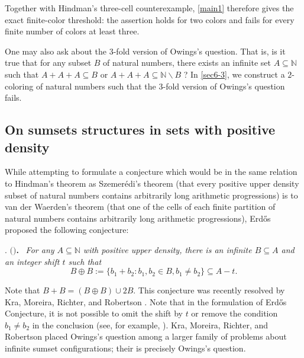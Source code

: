 \documentclass[reqno,12pt]{amsart}
\def \N {\mathbb N}
\numberwithin{equation}{section}
\begin{document}
Together with Hindman's
three-cell counterexample, \cref{main1} therefore gives the exact
finite-color threshold: the assertion holds for two colors and fails for
every finite number of colors at least three.

One may also ask about the $3$-fold version of Owings's question. That is, is it true that for any subset $B$ of natural numbers, there exists an infinite set $A\subseteq \N$ such that $A+A+A\subseteq B$ or $A+A+A\subseteq \N\backslash B$ ? In \cref{sec6-3}, we construct a $2$-coloring of natural numbers such that the $3$-fold version of Owings's question fails.

\subsection{On sumsets structures in sets with positive density}
While attempting to formulate a conjecture which would be in the same relation to Hindman's theorem as Szemer\'edi's theorem \cite[p.~199]{Szemeredi75} (that every positive upper density subset of natural numbers contains arbitrarily long arithmetic progressions) is to van der Waerden's theorem \cite[pp.~212--216]{Waerden27} (that one of the cells of each finite partition of natural numbers contains arbitrarily long arithmetic progressions), Erd\H{o}s proposed the following conjecture:

\medskip
{}. $($\cite[p.~305]{Erdos75}$)${\bf .} \ {\em For any $A\subseteq \N$ with positive upper density, there is an infinite $B\subseteq A$ and an integer shift $t$ such that}
	$$B\oplus B:=\{b_1+b_2:b_1,b_2\in B,b_1\neq b_2\}\subseteq A-t.$$

Note that $B+B=(B\mathbin{\oplus}B)\cup2B$. This conjecture was recently resolved by Kra, Moreira, Richter, and Robertson \cite[Theorem~1.2]{KraMoreiraRichterRobertson24}.
Note that in the formulation of Erd\H{o}s Conjecture, it is not possible to omit the shift by $t$ or remove the condition $b_1\neq b_2$ in the conclusion (see, for example, \cite[Examples 2.3, 3.6]{KraMoreiraRichterRobertson25-1}).
Kra, Moreira, Richter, and Robertson placed Owings's question among a larger
family of problems about infinite sumset configurations; their
\cite[Question~3.8]{KraMoreiraRichterRobertson25-1} is precisely Owings's
question.  %
\end{document}
